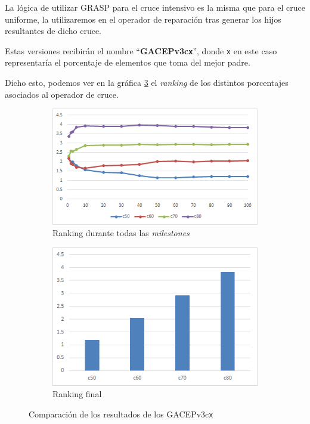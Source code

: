 La lógica de utilizar GRASP para el cruce intensivo es la misma que para el cruce uniforme, la utilizaremos en el operador de reparación tras generar los hijos resultantes de dicho cruce. 

Estas versiones recibirán el nombre ``\textbf{GACEPv3c\texttt{x}}'', donde \texttt{x} en este caso representaría el porcentaje de elementos que toma del mejor padre.

Dicho esto, podemos ver en la gráfica \ref{fig:GACEPcGRASP} el \textit{ranking} de los distintos porcentajes asociados al operador de cruce.

\begin{figure}[h]
     \centering
     \begin{subfigure}[b]{0.45\textwidth}
         \centering
         \includegraphics[width=\textwidth]{imagenes/Experimental/GACEPcGRASP.png}
         \caption{Ranking durante todas las \textit{milestones}}
         \label{fig:GACEPv3cGRASP_lineas}
     \end{subfigure}
     \hfill
     \begin{subfigure}[b]{0.45\textwidth}
         \centering
         \includegraphics[width=\textwidth]{imagenes/Experimental/barras/GACEPcGRASP.png}
         \caption{Ranking final}
         \label{fig:GACEPv3cGRASP_barras}
     \end{subfigure}
        \caption{Comparación de los resultados de los GACEPv3c\texttt{x}}
        \label{fig:GACEPcGRASP}
\end{figure}

